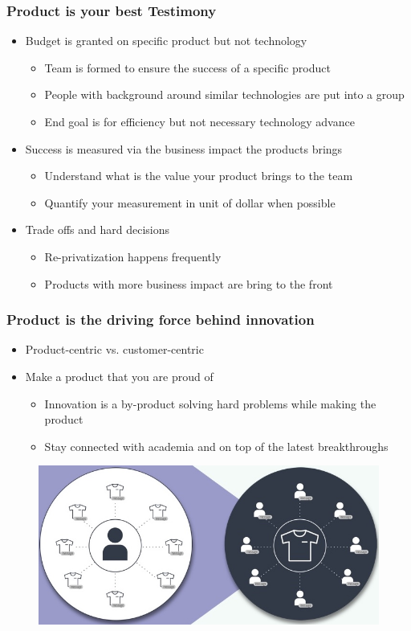 \documentclass[aspectratio=169,xcolor=x11names,table]{beamer}
\begin{document}
\begin{frame}
	\frametitle{Product is your best Testimony}
	\begin{itemize}
		\item<1> Budget is granted on specific product but not technology
			\begin{itemize}
				\item Team is formed to ensure the success of a specific product
				\item People with background around similar technologies are put into a group
				\item End goal is for efficiency but not necessary technology advance
			\end{itemize}
			\vspace{5mm}
		\item<2> Success is measured via the business impact the products brings
			\begin{itemize}
				\item Understand what is the value your product brings to the team
				\item Quantify your measurement in unit of dollar when possible
			\end{itemize}
			\vspace{5mm}
		\item<3> Trade offs and hard decisions
			\begin{itemize}
				\item Re-privatization happens frequently
				\item Products with more business impact are bring to the front
			\end{itemize}
	\end{itemize}
\end{frame}

\begin{frame}
	\frametitle{Product is the driving force behind innovation}
	\begin{itemize}
		\item Product-centric vs. customer-centric
		\item Make a product that you are proud of
			\begin{itemize}
				\item Innovation is a by-product solving hard problems while making the product
				\item Stay connected with academia and on top of the latest breakthroughs
			\end{itemize}
	\end{itemize}
	\vfill
	\begin{figure}
		\centering
		\includegraphics[width=0.7\linewidth]{product_customer}
	\end{figure}
\end{frame}
\end{document}
